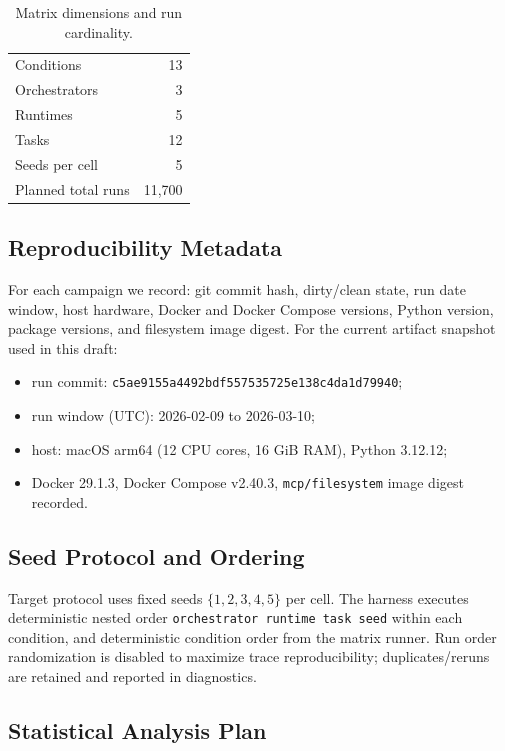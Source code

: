 \begin{table}[t]
\centering
\caption{Matrix dimensions and run cardinality.}
\label{tab:run_cardinality}
\begin{tabular}{lr}
\hline
Conditions & 13 \\
Orchestrators & 3 \\
Runtimes & 5 \\
Tasks & 12 \\
Seeds per cell & 5 \\
Planned total runs & 11,700 \\
\hline
\end{tabular}
\end{table}

\subsection{Reproducibility Metadata}
\label{sec:reproducibility}

For each campaign we record: git commit hash, dirty/clean state, run date window, host hardware, Docker and Docker Compose versions, Python version, package versions, and filesystem image digest. For the current artifact snapshot used in this draft:
\begin{itemize}
    \item run commit: \texttt{c5ae9155a4492bdf557535725e138c4da1d79940};
    \item run window (UTC): 2026-02-09 to 2026-03-10;
    \item host: macOS arm64 (12 CPU cores, 16 GiB RAM), Python 3.12.12;
    \item Docker 29.1.3, Docker Compose v2.40.3, \texttt{mcp/filesystem} image digest recorded.
\end{itemize}

\subsection{Seed Protocol and Ordering}
\label{sec:seed_protocol}

Target protocol uses fixed seeds \(\{1,2,3,4,5\}\) per cell. The harness executes deterministic nested order
\texttt{orchestrator \textrightarrow runtime \textrightarrow task \textrightarrow seed} within each condition, and deterministic condition order from the matrix runner. Run order randomization is disabled to maximize trace reproducibility; duplicates/reruns are retained and reported in diagnostics.

\subsection{Statistical Analysis Plan}
\label{sec:stats_plan}

